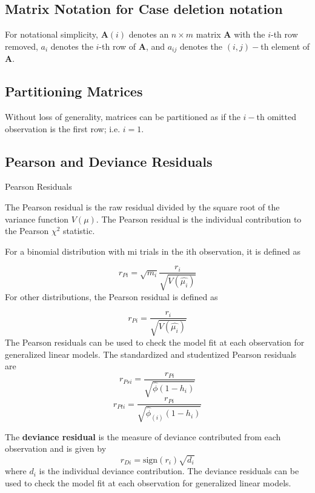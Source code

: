 \subsection{Matrix Notation for  Case deletion notation} %

For notational simplicity, $\boldsymbol{A}(i)$ denotes an $n \times m$ matrix $\boldsymbol{A}$ with the $i$-th row
removed, $a_i$ denotes the $i$-th row of $\boldsymbol{A}$, and $a_{ij}$ denotes the $(i, j)-$th element of $\boldsymbol{A}$.

\subsection{Partitioning Matrices} %
Without loss of generality, matrices can be partitioned as if the $i-$th omitted observation is the first row; i.e. $i=1$.

\subsection{Pearson and Deviance Residuals} 

Pearson Residuals

The Pearson residual is the raw residual divided by the square root of the variance function $V(\mu).$
The Pearson residual is the individual contribution to the Pearson $\chi^2$ statistic. 

For a binomial distribution with mi trials in the ith observation, it is defined as

\[ r_{Pi} = \sqrt{ m_{i}}
 \frac{r_{i}}{\sqrt{V(\hat{ \mu_{i}})}} \]
For other distributions, the Pearson residual is defined as

\[ r_{Pi} = \frac{r_{i}}{\sqrt{V(\hat{ \mu_{i}})}}\]
The Pearson residuals can be used to check the model fit at each observation for generalized linear models. 
The standardized and studentized Pearson residuals are
\[
r_{Psi} = \frac{r_{Pi}}{\sqrt{\hat{ \phi} (1- h_{i})} } \]
\[ r_{Pti} = \frac{r_{Pi}}{\sqrt{ \hat{ \phi}_{(i)}
 (1- h_{i})} } \]



The \textbf{deviance residual} is the measure of deviance contributed from each observation and is given by
\[r_{Di} = \textrm{sign}( r_{i})
 \sqrt{ d_{i}}\]
where $d_i$ is the individual deviance contribution.
The deviance residuals can be used to check the model fit at each observation for generalized linear models. 


